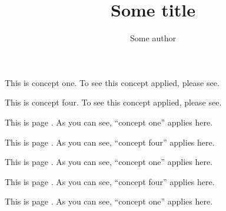 \documentclass[oneside]{book}
\begin{document}
\title{Some title}
\author{Some author}

\maketitle
This is concept one. To see this concept applied, please
see.

This is concept four. To see this concept applied, please
see.\newpage

This is page \thepage. As you can see, ``concept
one'' applies here.\newpage

This is page \thepage. As you can see,
``concept four'' applies here.\newpage

This is page \thepage. As you can see, ``concept
one'' applies here.\newpage

This is page \thepage. As you can see,
``concept four'' applies here.\newpage

This is page \thepage. As you can see, ``concept
one'' applies here.
\end{document}
